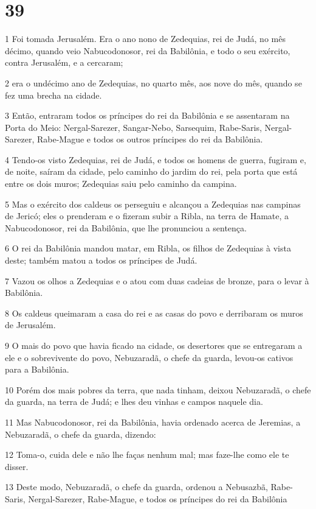 \chapter{39}

\par 1 Foi tomada Jerusalém. Era o ano nono de Zedequias, rei de Judá, no mês décimo, quando veio Nabucodonosor, rei da Babilônia, e todo o seu exército, contra Jerusalém, e a cercaram;
\par 2 era o undécimo ano de Zedequias, no quarto mês, aos nove do mês, quando se fez uma brecha na cidade.
\par 3 Então, entraram todos os príncipes do rei da Babilônia e se assentaram na Porta do Meio: Nergal-Sarezer, Sangar-Nebo, Sarsequim, Rabe-Saris, Nergal-Sarezer, Rabe-Mague e todos os outros príncipes do rei da Babilônia.
\par 4 Tendo-os visto Zedequias, rei de Judá, e todos os homens de guerra, fugiram e, de noite, saíram da cidade, pelo caminho do jardim do rei, pela porta que está entre os dois muros; Zedequias saiu pelo caminho da campina.
\par 5 Mas o exército dos caldeus os perseguiu e alcançou a Zedequias nas campinas de Jericó; eles o prenderam e o fizeram subir a Ribla, na terra de Hamate, a Nabucodonosor, rei da Babilônia, que lhe pronunciou a sentença.
\par 6 O rei da Babilônia mandou matar, em Ribla, os filhos de Zedequias à vista deste; também matou a todos os príncipes de Judá.
\par 7 Vazou os olhos a Zedequias e o atou com duas cadeias de bronze, para o levar à Babilônia.
\par 8 Os caldeus queimaram a casa do rei e as casas do povo e derribaram os muros de Jerusalém.
\par 9 O mais do povo que havia ficado na cidade, os desertores que se entregaram a ele e o sobrevivente do povo, Nebuzaradã, o chefe da guarda, levou-os cativos para a Babilônia.
\par 10 Porém dos mais pobres da terra, que nada tinham, deixou Nebuzaradã, o chefe da guarda, na terra de Judá; e lhes deu vinhas e campos naquele dia.
\par 11 Mas Nabucodonosor, rei da Babilônia, havia ordenado acerca de Jeremias, a Nebuzaradã, o chefe da guarda, dizendo:
\par 12 Toma-o, cuida dele e não lhe faças nenhum mal; mas faze-lhe como ele te disser.
\par 13 Deste modo, Nebuzaradã, o chefe da guarda, ordenou a Nebusazbã, Rabe-Saris, Nergal-Sarezer, Rabe-Mague, e todos os príncipes do rei da Babilônia
